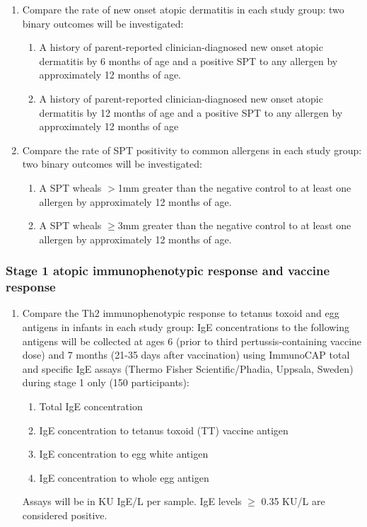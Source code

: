 \documentclass{bmcart}
\begin{document}
\begin{enumerate}
	\item Compare the rate of new onset atopic dermatitis in each study group:
	two binary outcomes will be investigated:
	\begin{enumerate}
		\item A history of parent-reported clinician-diagnosed new onset atopic dermatitis by 6 months of age and a positive SPT to any allergen by approximately 12 months of age.
		\item A history of parent-reported clinician-diagnosed new onset atopic dermatitis by 12 months of age and a positive SPT to any allergen by approximately 12 months of age
	\end{enumerate}
	\item Compare the rate of SPT positivity to common allergens in each study group:
	two binary outcomes will be investigated:
	\begin{enumerate}
		\item A SPT wheals $>$1mm greater than the negative control to at least one allergen by approximately 12 months of age.
		\item A SPT wheals $\geq$3mm greater than the negative control to at least one allergen by approximately 12 months of age.
	\end{enumerate}
\end{enumerate}

\subsubsection*{Stage 1 atopic immunophenotypic response and vaccine response}

\begin{enumerate}[resume]
	\item Compare the Th2 immunophenotypic response to tetanus toxoid and egg antigens in infants in each study group:
	IgE concentrations to the following antigens will be collected at ages 6 (prior to third pertussis-containing vaccine dose) and 7 months (21-35 days after vaccination) using ImmunoCAP total and specific IgE assays (Thermo Fisher Scientific/Phadia, Uppsala, Sweden) during stage 1 only (150 participants):
	\begin{enumerate}
		\item Total IgE concentration
		\item IgE concentration to tetanus toxoid (TT) vaccine antigen
		\item IgE concentration to egg white antigen
		\item IgE concentration to whole egg antigen
	\end{enumerate}
	Assays will be in KU IgE/L per sample.
	IgE levels $\geq$ 0.35 KU/L are considered positive.
\end{enumerate}
\end{document}

